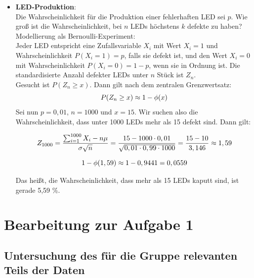 \documentclass{article}
\begin{document}
\begin{itemize}
    \item \textbf{LED-Produktion}:\\
    Die Wahrscheinlichkeit für die Produktion einer fehlerhaften LED sei $p$. Wie groß ist die Wahrscheinlichkeit, bei $n$ LEDs höchstens $k$ defekte zu haben?
    Modellierung als Bernoulli-Experiment:\\
    Jeder LED entspricht eine Zufallsvariable $X_{i}$ mit Wert $X_{i}=1$ und Wahrscheinlichkeit $P(X_{i}=1)=p$, falls sie defekt ist, und den Wert $X_{i} = 0$ mit Wahrscheinlichkeit $P(X_{i} = 0 ) = 1-p$, wenn sie in Ordnung ist. Die standardisierte Anzahl defekter LEDs unter $n$ Stück ist $Z_{n}$.\\
    Gesucht ist $P(Z_{n} \ge x)$. Dann gilt nach dem zentralen Grenzwertsatz:
    \begin{equation}
        P(Z_{n} \ge x) \approx 1-\phi(x) \notag 
    \end{equation}
    Sei nun $p=0,01$, $n=1000$ und $x=15$. Wir suchen also die Wahrscheinlichkeit, dass unter 1000 LEDs mehr als 15 defekt sind. Dann gilt:
    
    \begin{equation}
        Z_{1000} = \frac{\sum_{i=1}^{1000} X_{i} - n\mu}{\sigma\sqrt{n}} = \frac{15 - 1000\cdot0,01}{\sqrt{0,01 \cdot 0,99 \cdot 1000}} = \frac{15 - 10}{3,146} \approx 1,59 \notag 
    \end{equation}
    
    \begin{equation}
        1-\phi(1,59) \approx 1-0,9441=0,0559 \notag
    \end{equation}
    
    Das heißt, die Wahrscheinlichkeit, dass mehr als 15 LEDs kaputt sind, ist gerade 5,59 \%.
\end{itemize}


\newpage
\section{Bearbeitung zur Aufgabe 1}
\subsection{Untersuchung des für die Gruppe relevanten Teils der Daten}
\end{document}

